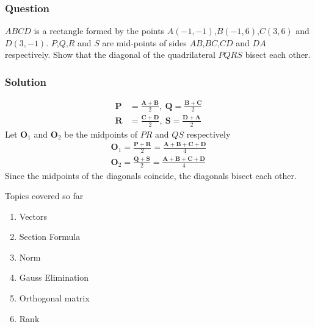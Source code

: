 \documentclass{beamer}
\providecommand{\brak}[1]{\ensuremath{\left(#1\right)}}
\theoremstyle{remark}
\let\vec\mathbf
\begin{document}
%
\begin{frame}
\frametitle{Question }
$ABCD$ is a rectangle formed by the points $A\brak{-1,-1}$,$B\brak{-1,6}$,$C\brak{3,6}$ and $D\brak{3,-1}$. $P$,$Q$,$R$ and $S$ are mid-points of sides $AB$,$BC$,$CD$ and $DA$ respectively. Show that the diagonal of the quadrilateral $PQRS$ bisect each other. 
\end{frame}
%
\begin{frame}
\frametitle{Solution}
\begin{align}
    \vec{P}&=\frac{\vec{A}+\vec{B}}{2},\
        \vec{Q}=\frac{\vec{B}+\vec{C}}{2}\\
    \vec{R}&=\frac{\vec{C}+\vec{D}}{2},\
    \vec{S}=\frac{\vec{D}+\vec{A}}{2}
    \end{align}
Let $\vec{O}_1$ and $\vec{O}_2$ be the midpoints of $PR$ and $QS$ respectively
\begin{align}
    \vec{O}_1 = \frac{\vec{P}+\vec{R}}{2}=\frac{\vec{A}+\vec{B}+\vec{C}+\vec{D}}{4}\\
      \vec{O}_2 = \frac{\vec{Q}+\vec{S}}{2}=\frac{\vec{A}+\vec{B}+\vec{C}+\vec{D}}{4}
\end{align}
Since the midpoints of the diagonals coincide, the diagonals bisect each other. 
\end{frame}
%
\begin{frame}{Topics covered so far}
    \begin{enumerate}
        \item {Vectors}
        \item {Section Formula}
        \item {Norm}
        \item {Gauss Elimination}
        \item {Orthogonal matrix}
        \item {Rank}
    \end{enumerate}
\end{frame}
%
\end{document}
